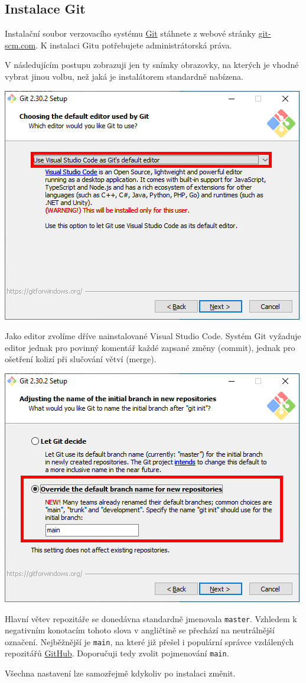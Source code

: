 \documentclass[a4paper,11pt,twoside]{article}
\def\code#1{\textnormal{\texttt{#1}}}
\theoremstyle{red}
\theoremstyle{green}
\begin{document}
\subsection{Instalace Git}
    Instalační soubor verzovacího systému \href{https://git-scm.com}{Git} stáhnete z webové stránky \href{https://git-scm.com}{git-scm.com}.
    K instalaci Gitu potřebujete administrátorská práva.
    
    V následujícím postupu zobrazuji jen ty snímky obrazovky, na kterých je vhodné vybrat jinou volbu, než jaká je instalátorem standardně nabízena.
    \begin{center}\includegraphics[width=0.5\linewidth]{GitInstallEditor.png}\end{center}
    Jako editor zvolíme dříve nainstalované Visual Studio Code.
    Systém Git vyžaduje editor jednak pro povinný komentář každé zapsané změny (commit), jednak pro ošetření kolizí při slučování větví (merge).
    \begin{center}\includegraphics[width=0.5\linewidth]{GitInstallMain.png}\end{center}
    Hlavní větev repozitáře se donedávna standardně jmenovala \code{master}.
    Vzhledem k negativním konotacím tohoto slova v angličtině se přechází na neutrálnější označení.
    Nejběžnější je \code{main}, na které již přešel i populární správce vzdálených repozitářů \href{https://github.com}{GitHub}.
    Doporučuji tedy zvolit pojmenování \code{main}.

    Všechna nastavení lze samozřejmě kdykoliv po instalaci změnit.
\end{document}
